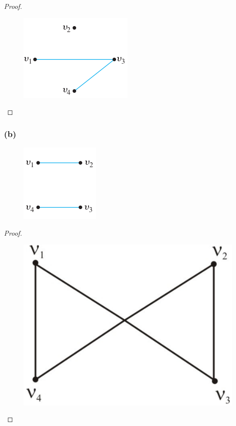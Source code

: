 \documentclass[14pt]{extarticle}
\begin{document}
\begin{proof}
\begin{figure}[ht!]
\centering
\includegraphics[scale=0.5]{../images/10.1.24.a.2.png}
\end{figure}
\end{proof}

\subsubsection{(b)}
\begin{figure}[ht!]
\centering
\includegraphics[scale=0.5]{../images/10.1.24.b.1.png}
\end{figure}

\begin{proof}
\begin{figure}[ht!]
\centering
\includegraphics[scale=0.1]{../images/10.1.24.b.2.png}
\end{figure}
\end{proof}
\end{document}
